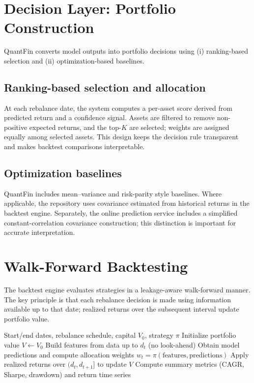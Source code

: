 \documentclass{svproc}
\begin{document}
\section{Decision Layer: Portfolio Construction}\label{sec:portfolio}
QuantFin converts model outputs into portfolio decisions using (i) ranking-based selection and (ii) optimization-based baselines.

\subsection{Ranking-based selection and allocation}\label{sec:ranking}
At each rebalance date, the system computes a per-asset score derived from predicted return and a confidence signal. Assets are filtered to remove non-positive expected returns, and the top-$K$ are selected; weights are assigned equally among selected assets. This design keeps the decision rule transparent and makes backtest comparisons interpretable.

\subsection{Optimization baselines}\label{sec:opt}
QuantFin includes mean--variance and risk-parity style baselines. Where applicable, the repository uses covariance estimated from historical returns in the backtest engine. Separately, the online prediction service includes a simplified constant-correlation covariance construction; this distinction is important for accurate interpretation.

\section{Walk-Forward Backtesting}\label{sec:backtest}
The backtest engine evaluates strategies in a leakage-aware walk-forward manner. The key principle is that each rebalance decision is made using information available up to that date; realized returns over the subsequent interval update portfolio value.

\begin{algorithm}[h!]
\caption{Leakage-aware walk-forward backtest (high-level)}
\label{alg:backtest}
\begin{algorithmic}[1]
\REQUIRE Start/end dates, rebalance schedule, capital $V_0$, strategy $\pi$
\STATE Initialize portfolio value $V \leftarrow V_0$
  \STATE Build features from data up to $d_t$ (no look-ahead)
  \STATE Obtain model predictions and compute allocation weights $w_t = \pi(\text{features}, \text{predictions})$
  \STATE Apply realized returns over $(d_t, d_{t+1}]$ to update $V$
\ENDFOR
\STATE Compute summary metrics (CAGR, Sharpe, drawdown) and return time series
\end{algorithmic}
\end{algorithm}
\end{document}

